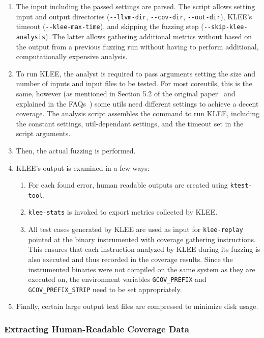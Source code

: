 \documentclass{article}
\let\savedCite=\cite
\renewcommand{\cite}{\unskip~\savedCite}
\begin{document}
\begin{multicols}{2}
    \begin{enumerate}
        \item The input including the passed settings are parsed. The script allows setting input and output directories (\lstinline{--llvm-dir}, \lstinline{--cov-dir}, \lstinline{--out-dir}), KLEE's timeout (\lstinline{--klee-max-time}), and skipping the fuzzing step (\lstinline{--skip-klee-analysis}). The latter allows gathering additional metrics without based on the output from a previous fuzzing run without having to perform additional, computationally expensive analysis.
        \item To run KLEE, the analyst is required to pass arguments setting the size and number of inputs and input files to be tested. For most coreutils, this is the same, however (as mentioned in Section 5.2 of the original paper\cite{KLEE} and explained in the FAQs\cite{KLEEFAQ}) some utils need different settings to achieve a decent coverage. The analysis script assembles the command to run KLEE, including the constant settings, util-dependant settings, and the timeout set in the script arguments.
        \item Then, the actual fuzzing is performed.
        \item KLEE's output is examined in a few ways:\begin{enumerate}
                  \item For each found error, human readable outputs are created using \lstinline{ktest-tool}.
                  \item \lstinline{klee-stats} is invoked to export metrics collected by KLEE.
                  \item All test cases generated by KLEE are used as input for \lstinline{klee-replay} pointed at the binary instrumented with coverage gathering instructions. This ensures that each instruction analyzed by KLEE during its fuzzing is also executed and thus recorded in the coverage results. Since the instrumented binaries were not compiled on the same system as they are executed on, the environment variables \lstinline{GCOV_PREFIX} and \lstinline{GCOV_PREFIX_STRIP} need to be set appropriately.
              \end{enumerate}
        \item Finally, certain large output text files are compressed to minimize disk usage.
    \end{enumerate}

    \subsubsection{Extracting Human-Readable Coverage Data}


\end{multicols}
\end{document}
